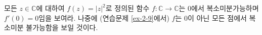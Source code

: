 \begin{salt_exercise} \label{ex-2-1}
모든 $z\in\mathbb C$에 대하여 $f(z) = |z|^2$로 정의된
함수 $f:\mathbb C \to \mathbb C$는 $0$에서 복소미분가능하며
$f'(0)=0$임을 보여라.
나중에 (연습문제 \ref{ex-2-9}에서) $f$는 $0$이 아닌 모든 점에서 복소미분 불가능함을 보일 것이다.
\end{salt_exercise}


\begin{salt_exercise} \label{ex-2-2}

\end{salt_exercise}

\begin{salt_exercise} \label{ex-2-3}

\end{salt_exercise}


\begin{salt_exercise} \label{ex-2-4}

\end{salt_exercise}


\begin{salt_exercise} \label{ex-2-5}

\end{salt_exercise}


\begin{salt_exercise} \label{ex-2-6}

\end{salt_exercise}


\begin{salt_exercise} \label{ex-2-7}

\end{salt_exercise}

\begin{salt_exercise} \label{ex-2-8}

\end{salt_exercise}

\begin{salt_exercise} \label{ex-2-9}

\end{salt_exercise}



